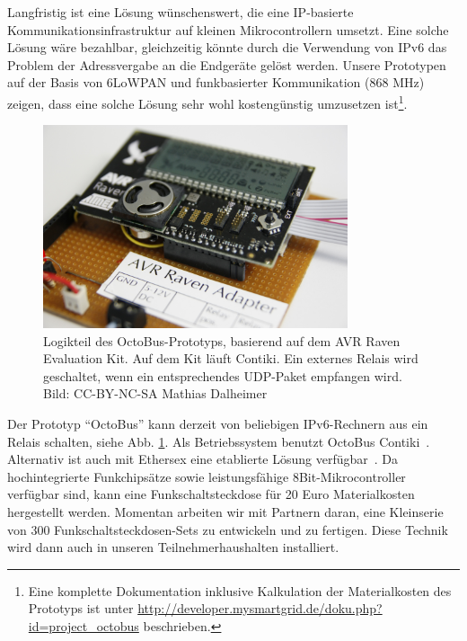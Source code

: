 \documentclass[12pt,BCOR=8.5mm]{scrartcl}
\newcommand*\imgwidth{0.8\textwidth}
\begin{document}
Langfristig ist eine Lösung wünschenswert, die eine IP-basierte
Kommunikationsinfrastruktur auf kleinen Mikrocontrollern umsetzt. Eine
solche Lösung wäre bezahlbar, gleichzeitig könnte durch die Verwendung
von IPv6 das Problem der Adressvergabe an die Endgeräte gelöst werden.
Unsere Prototypen auf der Basis von 6LoWPAN und funkbasierter Kommunikation
(868 MHz) zeigen, dass eine solche Lösung sehr wohl
kostengünstig umzusetzen ist\footnote{Eine komplette Dokumentation
inklusive Kalkulation der Materialkosten des
Prototyps ist unter
\url{http://developer.mysmartgrid.de/doku.php?id=project_octobus}
beschrieben.}.
\begin{figure}[htbp]
  \begin{center}
    \includegraphics[width=\imgwidth]{figures/raven-adapter.JPG}
    \caption{Logikteil des OctoBus-Prototyps, basierend auf dem AVR
    Raven Evaluation Kit. Auf dem Kit läuft Contiki. Ein externes Relais
    wird geschaltet, wenn ein entsprechendes UDP-Paket empfangen wird.
    Bild: CC-BY-NC-SA Mathias Dalheimer}
    \label{fig:raven-adapter}
  \end{center}
\end{figure}
Der Prototyp "`OctoBus"' kann derzeit von beliebigen IPv6-Rechnern aus
ein Relais schalten, siehe Abb. \ref{fig:raven-adapter}.  Als
Betriebssystem benutzt OctoBus Contiki~\cite{yazar09efficient}.
Alternativ ist auch mit Ethersex eine etablierte Lösung
verfügbar~\cite{web:ethersex}. Da hochintegrierte Funkchipsätze sowie leistungsfähige
8Bit-Mikrocontroller verfügbar sind, kann eine
Funkschaltsteckdose für 20 Euro Materialkosten hergestellt werden.
Momentan arbeiten wir mit Partnern daran, eine Kleinserie von 300
Funkschaltsteckdosen-Sets zu entwickeln und zu fertigen. Diese Technik
wird dann auch in unseren Teilnehmerhaushalten installiert.
\end{document}
